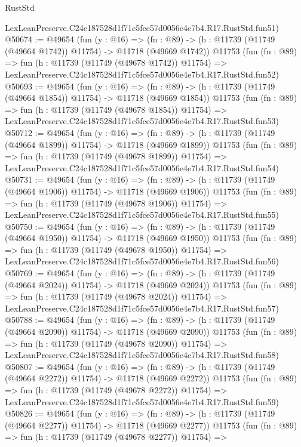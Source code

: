 \begin{lexlean}{RustStd}
\begin{coremodule}
    LexLeanPreserve.C24c187528d1f71c5fce57d0056e4e7b4.R17.RustStd.fun51)
@50674 := @49654
    (fun (y : @16) =>
    (fn : @89) -> (h : @11739 (@11749 (@49664 @1742)) @11754) -> @11718 (@49669 @1742))
    @11753
    (fun (fn : @89) =>
    fun (h : @11739 (@11749 (@49678 @1742)) @11754) =>
    LexLeanPreserve.C24c187528d1f71c5fce57d0056e4e7b4.R17.RustStd.fun52)
@50693 := @49654
    (fun (y : @16) =>
    (fn : @89) -> (h : @11739 (@11749 (@49664 @1854)) @11754) -> @11718 (@49669 @1854))
    @11753
    (fun (fn : @89) =>
    fun (h : @11739 (@11749 (@49678 @1854)) @11754) =>
    LexLeanPreserve.C24c187528d1f71c5fce57d0056e4e7b4.R17.RustStd.fun53)
@50712 := @49654
    (fun (y : @16) =>
    (fn : @89) -> (h : @11739 (@11749 (@49664 @1899)) @11754) -> @11718 (@49669 @1899))
    @11753
    (fun (fn : @89) =>
    fun (h : @11739 (@11749 (@49678 @1899)) @11754) =>
    LexLeanPreserve.C24c187528d1f71c5fce57d0056e4e7b4.R17.RustStd.fun54)
@50731 := @49654
    (fun (y : @16) =>
    (fn : @89) -> (h : @11739 (@11749 (@49664 @1906)) @11754) -> @11718 (@49669 @1906))
    @11753
    (fun (fn : @89) =>
    fun (h : @11739 (@11749 (@49678 @1906)) @11754) =>
    LexLeanPreserve.C24c187528d1f71c5fce57d0056e4e7b4.R17.RustStd.fun55)
@50750 := @49654
    (fun (y : @16) =>
    (fn : @89) -> (h : @11739 (@11749 (@49664 @1950)) @11754) -> @11718 (@49669 @1950))
    @11753
    (fun (fn : @89) =>
    fun (h : @11739 (@11749 (@49678 @1950)) @11754) =>
    LexLeanPreserve.C24c187528d1f71c5fce57d0056e4e7b4.R17.RustStd.fun56)
@50769 := @49654
    (fun (y : @16) =>
    (fn : @89) -> (h : @11739 (@11749 (@49664 @2024)) @11754) -> @11718 (@49669 @2024))
    @11753
    (fun (fn : @89) =>
    fun (h : @11739 (@11749 (@49678 @2024)) @11754) =>
    LexLeanPreserve.C24c187528d1f71c5fce57d0056e4e7b4.R17.RustStd.fun57)
@50788 := @49654
    (fun (y : @16) =>
    (fn : @89) -> (h : @11739 (@11749 (@49664 @2090)) @11754) -> @11718 (@49669 @2090))
    @11753
    (fun (fn : @89) =>
    fun (h : @11739 (@11749 (@49678 @2090)) @11754) =>
    LexLeanPreserve.C24c187528d1f71c5fce57d0056e4e7b4.R17.RustStd.fun58)
@50807 := @49654
    (fun (y : @16) =>
    (fn : @89) -> (h : @11739 (@11749 (@49664 @2272)) @11754) -> @11718 (@49669 @2272))
    @11753
    (fun (fn : @89) =>
    fun (h : @11739 (@11749 (@49678 @2272)) @11754) =>
    LexLeanPreserve.C24c187528d1f71c5fce57d0056e4e7b4.R17.RustStd.fun59)
@50826 := @49654
    (fun (y : @16) =>
    (fn : @89) -> (h : @11739 (@11749 (@49664 @2277)) @11754) -> @11718 (@49669 @2277))
    @11753
    (fun (fn : @89) =>
    fun (h : @11739 (@11749 (@49678 @2277)) @11754) =>

\end{coremodule}
\end{lexlean}
